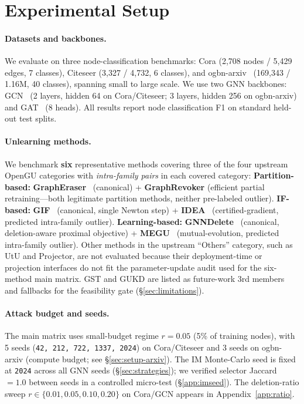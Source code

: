 \section{Experimental Setup}
\label{sec:experiment}

\paragraph{Datasets and backbones.}
We evaluate on three node-classification benchmarks:
Cora (2{,}708 nodes / 5{,}429 edges, 7 classes),
Citeseer (3{,}327 / 4{,}732, 6 classes), and
ogbn-arxiv~\cite{hu2020open} (169{,}343 / 1.16M, 40 classes), spanning
small to large scale. We use two GNN backbones: GCN~\cite{kipf2017semi}
(2 layers, hidden 64 on Cora/Citeseer; 3 layers, hidden 256 on
ogbn-arxiv) and GAT~\cite{velickovic2018graph} (8 heads). All results
report node classification F1 on standard held-out test splits.

\paragraph{Unlearning methods.}
We benchmark \textbf{six} representative methods covering three of the
four upstream OpenGU categories with \emph{intra-family pairs} in each
covered category:
\textbf{Partition-based:} \textbf{GraphEraser}~\cite{chen2022graph}
(canonical) + \textbf{GraphRevoker} (efficient partial retraining---both
legitimate partition methods, neither pre-labeled outlier).
\textbf{IF-based:} \textbf{GIF}~\cite{wu2023gif} (canonical, single Newton
step) + \textbf{IDEA}~\cite{dong2024idea} (certified-gradient, predicted
intra-family outlier).
\textbf{Learning-based:} \textbf{GNNDelete}~\cite{cheng2023gnndelete}
(canonical, deletion-aware proximal objective) +
\textbf{MEGU}~\cite{li2024towards} (mutual-evolution, predicted
intra-family outlier).
Other methods in the upstream ``Others'' category, such as UtU and
Projector, are not evaluated because their deployment-time or projection
interfaces do not fit the parameter-update audit used for the six-method
main matrix. GST and GUKD are listed as future-work 3rd members and
fallbacks for the feasibility gate (\S\ref{sec:limitations}).

\paragraph{Attack budget and seeds.}
The main matrix uses small-budget regime $r=0.05$ (5\% of training
nodes), with 5 seeds (\texttt{42, 212, 722, 1337, 2024}) on
Cora/Citeseer and 3 seeds on ogbn-arxiv (compute budget; see
\S\ref{sec:setup-arxiv}). The IM Monte-Carlo seed is fixed at
\texttt{2024} across all GNN seeds (\S\ref{sec:strategies}); we verified
selector Jaccard $=1.0$ between seeds in a controlled micro-test
(\S\ref{app:imseed}). The deletion-ratio sweep
$r\in\{0.01,0.05,0.10,0.20\}$ on Cora/GCN appears in
Appendix~\ref{app:ratio}.

